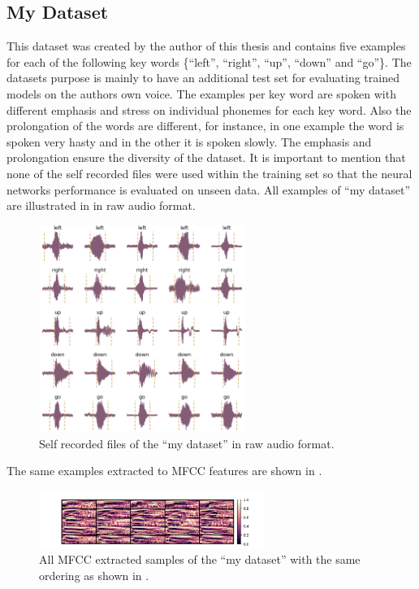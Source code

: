 \FloatBarrier
\noindent



\subsection{My Dataset}\label{sec:exp_dataset_my}
This dataset was created by the author of this thesis and contains five examples for each of the following key words \{\enquote{left}, \enquote{right}, \enquote{up}, \enquote{down} and \enquote{go}\}.
The datasets purpose is mainly to have an additional test set for evaluating trained models on the authors own voice.
The examples per key word are spoken with different emphasis and stress on individual phonemes for each key word.
Also the prolongation of the words are different, for instance, in one example the word is spoken very hasty and in the other it is spoken slowly.
The emphasis and prolongation ensure the diversity of the dataset.
It is important to mention that none of the self recorded files were used within the training set so that the neural networks performance is evaluated on unseen data.
All examples of \enquote{my dataset} are illustrated in  in raw audio format.
\begin{figure}[!ht]
  \centering
    \includegraphics[width=0.6\textwidth]{./5_exp/figs/exp_dataset_my_wav_grid.png}
  \caption{Self recorded files of the \enquote{my dataset} in raw audio format.}
  \label{fig:exp_dataset_my_wav_grid}
\end{figure}
\FloatBarrier
\noindent
The same examples extracted to MFCC features are shown in .
\begin{figure}[!ht]
  \centering
    \includegraphics[width=0.65\textwidth]{./5_exp/figs/exp_dataset_my_mfcc.png}
  \caption{All MFCC extracted samples of the \enquote{my dataset} with the same ordering as shown in .}
  \label{fig:exp_dataset_my_mfcc}
\end{figure}

